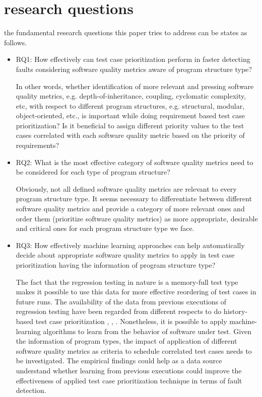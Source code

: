 \documentclass{sig-alternate}
\begin{document}
\section{research questions}
the fundamental research questions this paper tries to address can be states as follows.
\begin{itemize}
\item RQ1: How effectively can test case prioritization perform in faster detecting faults considering software quality metrics aware of program structure type?

In other words, whether identification of more relevant and pressing software quality metrics, e.g. depth-of-inheritance, coupling, cyclomatic complexity, etc, with respect to different program structures, e.g. structural, modular, object-oriented, etc., is important while doing requirement based test case prioritization? Is it beneficial  to assign different priority values to the test cases correlated with each software quality metric based on the priority of requirements? 
\item RQ2: What is the most effective category of software quality metrics need to be considered for each type of program structure?

Obviously, not all defined software quality metrics are relevant to every program structure type. It seems necessary to differentiate between different software quality metrics and provide a category of more relevant ones and order them (prioritize software quality metrics) as more appropriate, desirable and critical ones for each program structure type we face.
\item RQ3: How effectively machine learning approaches can help automatically decide about appropriate software quality metrics to apply in test case prioritization having the information of program structure type?

The fact that the regression testing in nature is a memory-full test type makes it possible to use this data for more effective reordering of test cases in future runs. The availability of the data from previous executions of regression testing have been regarded from different respects to do history-based test case prioritization \cite{kim:history}, \cite{khalilian:historical}, \cite{lin:history}. Nonetheless, it is possible to apply machine-learning algorithms to learn from the behavior of software under test. Given the information of program types, the impact of application of different software quality metrics as criteria to schedule correlated test cases needs to be investigated. The empirical findings could help as a data source understand whether learning from previous executions could improve the effectiveness of applied test case prioritization technique in terms of fault detection.
\end{itemize}
\end{document}

